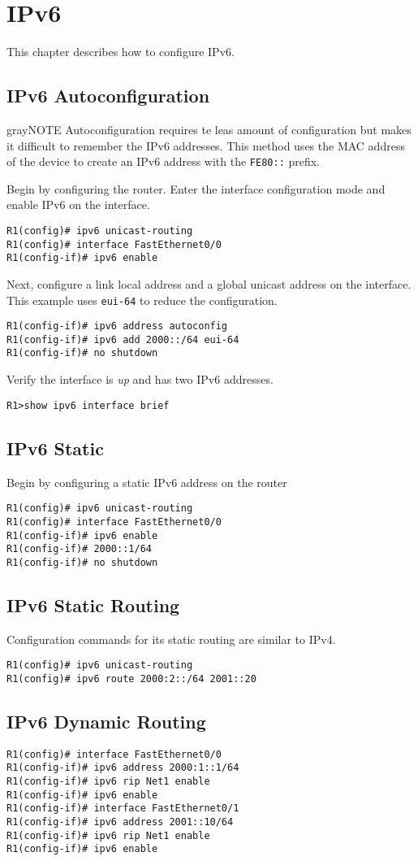\section{IPv6}
This chapter describes how to configure IPv6.

\subsection{IPv6 Autoconfiguration}
\begin{textbox}{gray}{NOTE}
Autoconfiguration requires te leas amount of configuration but makes it difficult to remember the IPv6 addresses.
This method uses the MAC address of the device to create an IPv6 address with the \verb!FE80::! prefix.
\end{textbox}
Begin by configuring the router. Enter the interface configuration mode and enable IPv6 on the interface.
\begin{verbatim}
R1(config)# ipv6 unicast-routing
R1(config)# interface FastEthernet0/0
R1(config-if)# ipv6 enable
\end{verbatim}
Next, configure a link local address and a global unicast address on the interface. This example uses \verb!eui-64! to reduce the configuration.
\begin{verbatim}
R1(config-if)# ipv6 address autoconfig
R1(config-if)# ipv6 add 2000::/64 eui-64
R1(config-if)# no shutdown
\end{verbatim}
Verify the interface is \textit{up} and has two IPv6 addresses.
\begin{verbatim}
R1>show ipv6 interface brief
\end{verbatim}

\subsection{IPv6 Static}
Begin by configuring a static IPv6 address on the router
\begin{verbatim}
R1(config)# ipv6 unicast-routing
R1(config)# interface FastEthernet0/0
R1(config-if)# ipv6 enable
R1(config-if)# 2000::1/64
R1(config-if)# no shutdown
\end{verbatim}

\subsection{IPv6 Static Routing}
Configuration commands for its static routing are similar to IPv4.
\begin{verbatim}
R1(config)# ipv6 unicast-routing
R1(config)# ipv6 route 2000:2::/64 2001::20
\end{verbatim}

\subsection{IPv6 Dynamic Routing}
\begin{verbatim}
R1(config)# interface FastEthernet0/0
R1(config-if)# ipv6 address 2000:1::1/64
R1(config-if)# ipv6 rip Net1 enable
R1(config-if)# ipv6 enable
R1(config-if)# interface FastEthernet0/1
R1(config-if)# ipv6 address 2001::10/64
R1(config-if)# ipv6 rip Net1 enable
R1(config-if)# ipv6 enable
\end{verbatim}

